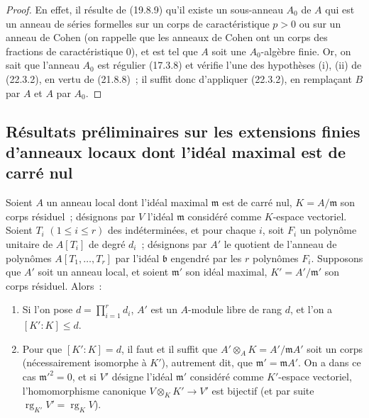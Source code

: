 \begin{proof}
En effet, il résulte de (19.8.9) qu'il existe un sous-anneau $A_0$ de $A$
qui est un anneau de séries formelles sur un corps de caractéristique $p>0$
ou sur un anneau de Cohen (on rappelle que les anneaux de Cohen ont un corps
des fractions de caractéristique $0$), et est tel que $A$ soit une
$A_0$-algèbre finie. Or, on sait que l'anneau $A_0$ est régulier (17.3.8) et
vérifie l'une des hypothèses (i), (ii) de (22.3.2), en vertu de (21.8.8)~;
il suffit donc d'appliquer (22.3.2), en remplaçant $B$ par $A$ et $A$ par
$A_0$.
\end{proof}

\subsection{Résultats préliminaires sur les extensions finies d'anneaux locaux dont l'idéal maximal est de carré nul}
\label{subsection:0.22.4-fr}
\label{0.22.4-fr}

\begin{proposition}[22.4.1]
\label{0.22.4.1-fr}
Soient $A$ un anneau local dont l'idéal maximal $\mathfrak m$ est de carré
nul, $K=A/\mathfrak m$ son corps résiduel~; désignons par $V$ l'idéal
$\mathfrak m$ considéré comme $K$-espace vectoriel. Soient $T_i$
$(1\leqslant i\leqslant r)$ des indéterminées, et pour chaque $i$, soit
$F_i$ un polynôme unitaire de $A[T_i]$ de degré $d_i$~; désignons par $A'$ le
quotient de l'anneau de polynômes $A[T_1,\ldots,T_r]$ par l'idéal
$\mathfrak b$ engendré par les $r$ polynômes $F_i$. Supposons que $A'$ soit
un anneau local, et soient $\mathfrak m'$ son idéal maximal,
$K'=A'/\mathfrak m'$ son corps résiduel. Alors~:
\begin{enumerate}
  \item[(i)] Si l'on pose $d=\prod_{i=1}^r d_i$, $A'$ est un $A$-module
  libre de rang $d$, et l'on a $[K':K]\leqslant d$.
  \item[(ii)] Pour que $[K':K]=d$, il faut et il suffit que
  $A'\otimes_AK=A'/\mathfrak mA'$ soit un corps (nécessairement isomorphe à
  $K'$), autrement dit, que $\mathfrak m'=\mathfrak mA'$. On a dans ce cas
  $\mathfrak m'^2=0$, et si $V'$ désigne l'idéal $\mathfrak m'$ considéré
  comme $K'$-espace vectoriel, l'homomorphisme canonique
  $V\otimes_KK'\to V'$ est bijectif (et par suite
  $\operatorname{rg}_{K'}V'=\operatorname{rg}_K V$).
\end{enumerate}
\end{proposition}

